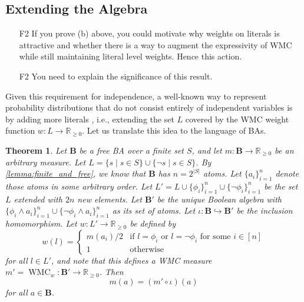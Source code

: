 \documentclass{article}
\newtheorem{theorem}{Theorem}
\theoremstyle{definition}
\theoremstyle{remark}
\DeclareMathOperator{\WMC}{WMC}
\begin{document}
\subsection{Extending the Algebra}

\begin{itemize}
\item[F2] If you prove (b) above, you could motivate why weights on literals
  is attractive and whether there is a way to augment the expressivity of WMC
  while still maintaining literal level weights. Hence this action.
\item[F2] You need to explain the significance of this result.
\end{itemize}

Given this requirement for independence, a well-known way to represent
probability distributions that do not consist entirely of independent variables
is by adding more literals \cite{DBLP:journals/ai/ChaviraD08}, i.e., extending
the set $L$ covered by the WMC weight function $w\colon L \to \mathbb{R}_{\ge
  0}$. Let us translate this idea to the language of BAs.

\begin{theorem} \label{thm:extension}
  Let $\mathbf{B}$ be a free BA over a finite set $S$, and let $m\colon
  \mathbf{B} \to \mathbb{R}_{\ge 0}$ be an arbitrary measure. Let $L = \{ s \mid
  s \in S \} \cup \{ \neg s \mid s \in S \}$. By \cref{lemma:finite_and_free},
  we know that $\mathbf{B}$ has $n = 2^{|S|}$ atoms. Let $\{a_i\}_{i=1}^n$
  denote those atoms in some arbitrary order. Let $L' = L \cup \{ \phi_i
  \}_{i=1}^n \cup \{\neg \phi_i \}_{i=1}^n$ be the set $L$ extended with $2n$
  new elements. Let $\mathbf{B'}$ be the unique Boolean algebra with $\{ \phi_i
  \land a_i \}_{i=1}^n \cup \{ \neg \phi_i \land a_i \}_{i=1}^n$ as its set of
  atoms. Let $\iota\colon \mathbf{B} \hookrightarrow \mathbf{B'}$ be the
  inclusion homomorphism. Let $w\colon L' \to \mathbb{R}_{\ge 0}$ be defined by
  \[
    w(l) = \begin{cases}
      m(a_i)/2 & \text{if } l = \phi_i \text{ or } l = \neg\phi_i \text{ for
        some } i \in [n] \\
      1 & \text{otherwise}
    \end{cases}
  \]
  for all $l \in L'$, and note that this defines a WMC measure $m' =
  \WMC_{w}\colon \mathbf{B'} \to \mathbb{R}_{\ge 0}$. Then
  \[
    m(a) = (m' \circ \iota)(a)
  \]
  for all $a \in \mathbf{B}$.
\end{theorem}
\end{document}
